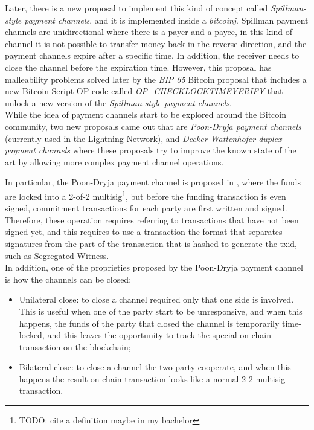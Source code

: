 Later, there is a new proposal to implement this kind of concept called \emph{Spillman-style payment channels}, and it is
implemented inside a \emph{bitcoinj}\cite{bitcoinj-impl}. Spillman payment channels are unidirectional where
there is a payer and a payee, in this kind of channel it is not possible to transfer money back in the reverse direction, and the payment
channels expire after a specific time.
In addition, the receiver needs to close the channel before the expiration time.
However, this proposal has malleability problems solved later by the \emph{BIP  65}\cite{bip65} Bitcoin proposal that includes a new Bitcoin Script OP code
called \emph{OP\_CHECKLOCKTIMEVERIFY} that unlock a new version of the \emph{Spillman-style payment channels}.\\
While the idea of payment channels start to be explored around the Bitcoin community, two new proposals came out that are
\emph{Poon-Dryja payment channels}\cite{lightning-network-paper} (currently used in the Lightning Network),
and \emph{Decker-Wattenhofer duplex payment channels}\cite{Decker2015fast} where these proposals try to improve the known state
of the art by allowing more complex payment channel operations.

In particular, the Poon-Dryja payment channel is proposed in \cite{lightning-network-paper}, where
the funds are locked into a 2-of-2 multisig\footnote{TODO: cite a definition maybe in my bachelor},
but before the funding transaction is even signed, commitment transactions for each party are first written and signed.
Therefore, these operation requires referring to transactions that have not been signed yet, and this requires to use a transaction
the format that separates signatures from the part of the transaction that is hashed to generate the txid, such as Segregated Witness.\\
In addition, one of the proprieties proposed by the Poon-Dryja payment channel is how the channels can be closed:

\begin{itemize}
  \item Unilateral close: to close a channel required only that one side is involved. This is useful when one
        of the party start to be unresponsive, and when this happens, the funds of
        the party that closed the channel is temporarily time-locked, and this leaves the opportunity to
        track the special on-chain transaction on the blockchain;
  \item Bilateral close: to close a channel the two-party cooperate, and when this happens the result
        on-chain transaction looks like a normal 2-2 multisig transaction.
\end{itemize}


